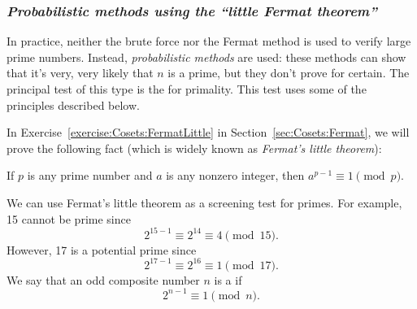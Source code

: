 \subsubsection*{\emph{Probabilistic methods using the ``little Fermat theorem''}}
In practice, neither the brute force nor the Fermat method is used to verify large prime numbers. Instead, 
\emph{probabilistic methods} are used: these methods can show that it's very, very likely that $n$ is a prime, but they don't prove for certain. The principal test of this type is the   for primality.  This test uses some of the principles described  below.	 
 
In Exercise~\ref{exercise:Cosets:FermatLittle} in Section~\ref{sec:Cosets:Fermat}, we will prove the following fact (which is widely known as \emph{Fermat's little theorem}): 
\medskip

If  $p$ is any prime number and $a$ is any nonzero integer, then $a^{p-1} \equiv 1 \pmod{p}$.  
\medskip

We can use Fermat's little theorem as a screening test for primes. For example, 15 cannot be prime since
$$
2^{15-1} \equiv 2^{14} \equiv 4 \pmod{15}.
$$
However, 17 is a potential prime since
$$
2^{17-1} \equiv 2^{16} \equiv 1 \pmod{17}.
$$
We say that an odd composite number $n$ is a  if 
$$
2^{n-1} \equiv 1 \pmod{n}.
$$

